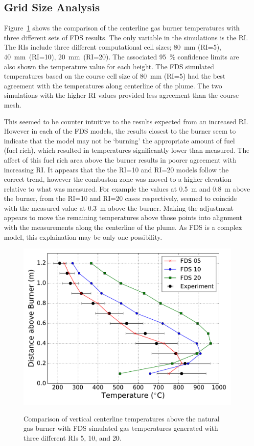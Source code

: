 \documentclass[twoside]{uocthesis}
\begin{document}
{\subsection{Grid Size Analysis}
Figure~\ref{FHNG01_RI} shows the comparison of the centerline gas burner temperatures with three different sets of FDS results.  The only variable in the simulations is the RI. The RIs include three different computational cell sizes; 80~mm (RI=5), 40~mm~(RI=10), 20~mm~(RI=20).  The associated 95~\% confidence limits are also shown the temperature value for each height.  The FDS simulated temperatures based on the course cell size of 80~mm (RI=5) had the best agreement with the temperatures along centerline of the plume.  The two simulations with the higher RI values provided less agreement than the course mesh.  

This seemed to be counter intuitive to the results expected from an increased RI.  However in each of the FDS models, the results closest to the burner seem to indicate that the model may not be `burning' the appropriate amount of fuel (fuel rich), which resulted in temperatures significantly lower than measured.  The affect of this fuel rich area above the burner results in poorer agreement with increasing RI.  It appears that the the RI=10 and RI=20 models follow the correct trend, however the combuston zone was moved to a higher elevation relative to what was measured.  For example the values at 0.5~m and 0.8~m above the burner, from the RI=10 and RI=20 cases respectively, seemed to coincide with the measured value at 0.3~m above the burner.  Making the adjustment appears to move the remaining temperatures above those points into alignment with the measurements along the centerline of the plume. As FDS is a complex model, this explaination may be only one possibility. 

\begin{figure}[h]
	\includegraphics[width=5in]{../Figures/FHNG01_RI} \\
	\caption[Comparison of vertical centerline temperatures above the natural gas burner with FDS simulated gas temperatures.]{Comparison of vertical centerline temperatures above the natural gas burner with FDS simulated gas temperatures generated with three different RIs 5, 10, and 20.}
	\label{FHNG01_RI}
\end{figure}

}
\end{document}
